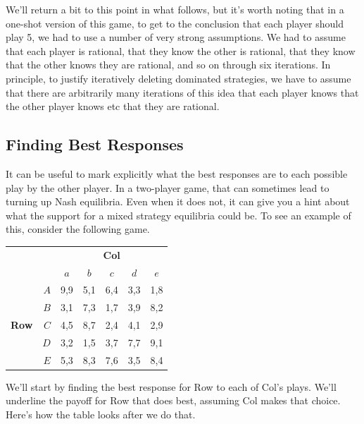 \documentclass[openany]{book}
\begin{document}
We'll return a bit to this point in what follows, but it's worth noting that in a one-shot version of this game, to get to the conclusion that each player should play 5, we had to use a number of very strong assumptions. We had to assume that each player is rational, that they know the other is rational, that they know that the other knows they are rational, and so on through six iterations. In principle, to justify iteratively deleting dominated strategies, we have to assume that there are arbitrarily many iterations of this idea that each player knows that the other player knows etc that they are rational.

\subsection{Finding Best Responses}

It can be useful to mark explicitly what the best responses are to each possible play by the other player. In a two-player game, that can sometimes lead to turning up Nash equilibria. Even when it does not, it can give you a hint about what the support for a mixed strategy equilibria could be. To see an example of this, consider the following game.

\begin{center}
\begin{tabular}{l r | c c c c c}
& & \multicolumn{5}{c}{\textbf{Col}} \\
& & $a$ & $b$ & $c$ & $d$ & $e$ \\ \hline
\multirow{5}{*}{\textbf{Row}}
& $A$ & 9,9 & 5,1 & 6,4 & 3,3 & 1,8\\
& $B$ & 3,1 & 7,3 & 1,7 & 3,9 & 8,2 \\
& $C$ & 4,5 & 8,7 & 2,4 & 4,1 & 2,9\\
& $D$ & 3,2 & 1,5 & 3,7 & 7,7 & 9,1\\
& $E$ & 5,3 & 8,3 & 7,6 & 3,5 & 8,4
\end{tabular}
\end{center}
We'll start by finding the best response for Row to each of Col's plays. We'll underline the payoff for Row that does best, assuming Col makes that choice. Here's how the table looks after we do that.
\end{document}
